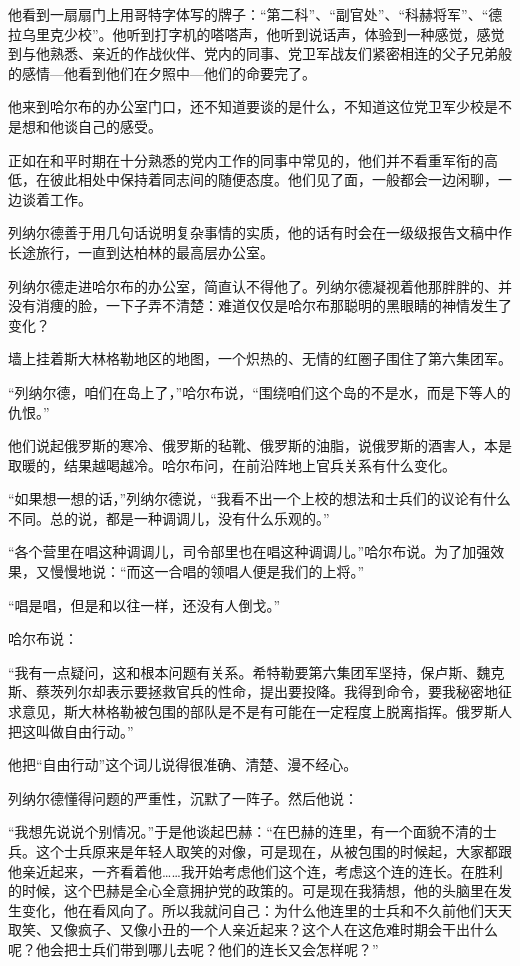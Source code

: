 他看到一扇扇门上用哥特字体写的牌子：“第二科”、“副官处”、“科赫将军”、“德拉乌里克少校”。他听到打字机的嗒嗒声，他听到说话声，体验到一种感觉，感觉到与他熟悉、亲近的作战伙伴、党内的同事、党卫军战友们紧密相连的父子兄弟般的感情—他看到他们在夕照中—他们的命要完了。

他来到哈尔布的办公室门口，还不知道要谈的是什么，不知道这位党卫军少校是不是想和他谈自己的感受。

正如在和平时期在十分熟悉的党内工作的同事中常见的，他们并不看重军衔的高低，在彼此相处中保持着同志间的随便态度。他们见了面，一般都会一边闲聊，一边谈着工作。

列纳尔德善于用几句话说明复杂事情的实质，他的话有时会在一级级报告文稿中作长途旅行，一直到达柏林的最高层办公室。

列纳尔德走进哈尔布的办公室，简直认不得他了。列纳尔德凝视着他那胖胖的、并没有消痩的脸，一下子弄不清楚：难道仅仅是哈尔布那聪明的黑眼睛的神情发生了变化？

墙上挂着斯大林格勒地区的地图，一个炽热的、无情的红圈子围住了第六集团军。

“列纳尔德，咱们在岛上了，”哈尔布说，“围绕咱们这个岛的不是水，而是下等人的仇恨。”

他们说起俄罗斯的寒冷、俄罗斯的毡靴、俄罗斯的油脂，说俄罗斯的酒害人，本是取暖的，结果越喝越冷。哈尔布问，在前沿阵地上官兵关系有什么变化。

“如果想一想的话，”列纳尔德说，“我看不出一个上校的想法和士兵们的议论有什么不同。总的说，都是一种调调儿，没有什么乐观的。”

“各个营里在唱这种调调儿，司令部里也在唱这种调调儿。”哈尔布说。为了加强效果，又慢慢地说：“而这一合唱的领唱人便是我们的上将。”

“唱是唱，但是和以往一样，还没有人倒戈。”

哈尔布说：

“我有一点疑问，这和根本问题有关系。希特勒要第六集团军坚持，保卢斯、魏克斯、蔡茨列尔却表示要拯救官兵的性命，提出要投降。我得到命令，要我秘密地征求意见，斯大林格勒被包围的部队是不是有可能在一定程度上脱离指挥。俄罗斯人把这叫做自由行动。”

他把“自由行动”这个词儿说得很准确、清楚、漫不经心。

列纳尔德懂得问题的严重性，沉默了一阵子。然后他说：

“我想先说说个别情况。”于是他谈起巴赫：“在巴赫的连里，有一个面貌不清的士兵。这个士兵原来是年轻人取笑的对像，可是现在，从被包围的时候起，大家都跟他亲近起来，一齐看着他……我开始考虑他们这个连，考虑这个连的连长。在胜利的时候，这个巴赫是全心全意拥护党的政策的。可是现在我猜想，他的头脑里在发生变化，他在看风向了。所以我就问自己：为什么他连里的士兵和不久前他们天天取笑、又像疯子、又像小丑的一个人亲近起来？这个人在这危难时期会干出什么呢？他会把士兵们带到哪儿去呢？他们的连长又会怎样呢？”

